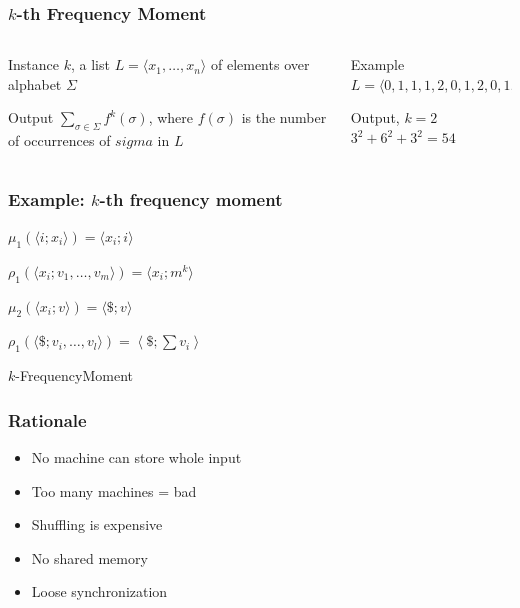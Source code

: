 \documentclass[12pt,aspectratio=169]{beamer}
\begin{document}
\begin{frame}\frametitle{$k$-th Frequency Moment }
\begin{columns} 
  \begin{column}{0.48\textwidth}
  \begin{block}{Instance}
    $k$, a list $L=\langle x_{1}, \ldots, x_{n} \rangle$ of elements over alphabet $\Sigma$
  \end{block}
  \begin{block}{Output}
    $\sum_{\sigma\in\Sigma} f^{k}(\sigma)$, where $f(\sigma)$ is the number of occurrences
    of $sigma$ in $L$
  \end{block}
\end{column}
    
\begin{column}{0.48\textwidth}
      \begin{block}{Example}
        $L=\langle 0,1,1,1,2,0,1,2,0,1,1,2\rangle$
      \end{block}
      \begin{block}{Output, $k=2$}
        $3^{2}+6^{2}+ 3^{2} =54$
      \end{block}
    \end{column}
\end{columns}
\end{frame}




\begin{frame}\frametitle{Example: $k$-th frequency moment}
\begin{algorithm}[H]

$\mu_{1}(\langle i; x_{i} \rangle) = \langle x_{i}; i \rangle$

$\rho_{1}  (\langle x_{i} ; {v_{1} , \ldots , v_{m}} \rangle) = \langle x_{i} ;
m^{k}\rangle$

$\mu_{2}(\langle x_{i} ; v \rangle) = \langle \$ ; v \rangle$ 

$\rho_{1}  (\langle \$ ; {v_{i} , \ldots , v_{l}} \rangle) = \left\langle \$
; \sum v_{i} \right\rangle $\;
\caption{$k$-FrequencyMoment}
\end{algorithm}
\end{frame}

\begin{frame}\frametitle{Rationale}
\begin{itemize}
\item
  No machine can store whole input
\item
  Too many machines = \alert{bad}
\item
  Shuffling is expensive
\item
  No shared memory
\item
  Loose synchronization
\end{itemize}
\end{frame}
\end{document}
